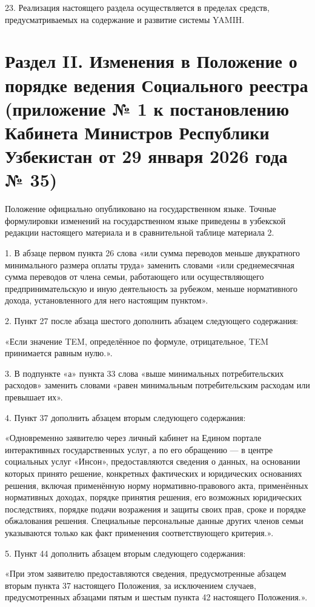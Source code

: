 \documentclass[14pt,a4paper]{extarticle}
\newcommand{\norm}[1]{\par\noindent\hspace*{1.27cm}#1. }
\begin{document}
\norm{23}Реализация настоящего раздела осуществляется в пределах средств, предусматриваемых на содержание и развитие системы YAMIH.

\section*{Раздел II. Изменения в Положение о порядке ведения Социального реестра (приложение № 1 к постановлению Кабинета Министров Республики Узбекистан от 29 января 2026 года № 35)}

Положение официально опубликовано на государственном языке. Точные формулировки изменений на государственном языке приведены в узбекской редакции настоящего материала и в сравнительной таблице материала 2.

\norm{1}В абзаце первом пункта 26 слова «или сумма переводов меньше двукратного минимального размера оплаты труда» заменить словами «или среднемесячная сумма переводов от члена семьи, работающего или осуществляющего предпринимательскую и иную деятельность за рубежом, меньше нормативного дохода, установленного для него настоящим пунктом».

\norm{2}Пункт 27 после абзаца шестого дополнить абзацем следующего содержания:

«Если значение TEM, определённое по формуле, отрицательное, TEM принимается равным нулю.».

\norm{3}В подпункте «а» пункта 33 слова «выше минимальных потребительских расходов» заменить словами «равен минимальным потребительским расходам или превышает их».

\norm{4}Пункт 37 дополнить абзацем вторым следующего содержания:

«Одновременно заявителю через личный кабинет на Едином портале интерактивных государственных услуг, а по его обращению — в центре социальных услуг «Инсон», предоставляются сведения о данных, на основании которых принято решение, конкретных фактических и юридических основаниях решения, включая применённую норму нормативно-правового акта, применённых нормативных доходах, порядке принятия решения, его возможных юридических последствиях, порядке подачи возражения и защиты своих прав, сроке и порядке обжалования решения. Специальные персональные данные других членов семьи указываются только как факт применения соответствующего критерия.».

\norm{5}Пункт 44 дополнить абзацем вторым следующего содержания:

«При этом заявителю предоставляются сведения, предусмотренные абзацем вторым пункта 37 настоящего Положения, за исключением случаев, предусмотренных абзацами пятым и шестым пункта 42 настоящего Положения.».
\end{document}
